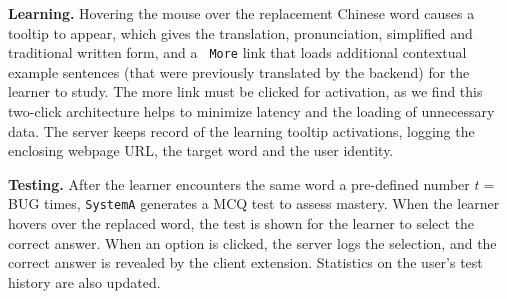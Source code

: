 
{\bf Learning.} Hovering the mouse over the replacement Chinese word
causes a tooltip to appear, which gives the translation,
pronunciation, simplified and traditional written form, and a {\tt
  More} link that loads additional contextual example sentences (that
were previously translated by the backend) for the learner to study.
The more link must be clicked for activation, as we find this
two-click architecture helps to minimize latency and the loading of
unnecessary data.  The server keeps record of the learning tooltip
activations, logging the enclosing webpage URL, the target word and
the user identity.


{\bf Testing.}  After the learner encounters the same word a
pre-defined number $t=$BUG times, {\tt SystemA} generates a MCQ test
to assess mastery.  When the learner hovers over the replaced word,
the test is shown for the learner to select the correct answer. When
an option is clicked, the server logs the selection, and the correct
answer is revealed by the client extension.  Statistics on the user's
test history are also updated.

